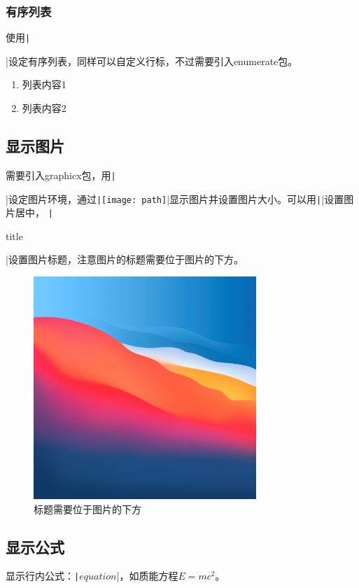 \documentclass[fontset=ubuntu]{ctexart}
\begin{document}
\subsubsection{有序列表}
使用\texttt|\begin{enumerate} \end{enumerate}|设定有序列表，同样可以自定义行标，不过需要引入enumerate包。
\begin{enumerate}[1)]
    \item 列表内容1
    \item 列表内容2
\end{enumerate}

\subsection{显示图片}
需要引入graphicx包，用\texttt|\begin{figure} \end{figure}|设定图片环境，通过\texttt|\texttt{[image: path]}|显示图片并设置图片大小。可以用\texttt|\centering|设置图片居中，
\texttt|\caption{title}|设置图片标题，注意图片的标题需要位于图片的下方。

\begin{figure}[htb]
\centering
\includegraphics[width=0.75\textwidth]{big_sur_1.jpg}
\caption{标题需要位于图片的下方}
\end{figure}

\subsection{显示公式}
显示行内公式：\texttt|$equation$|，如质能方程$E = mc^2$。
\end{document}
